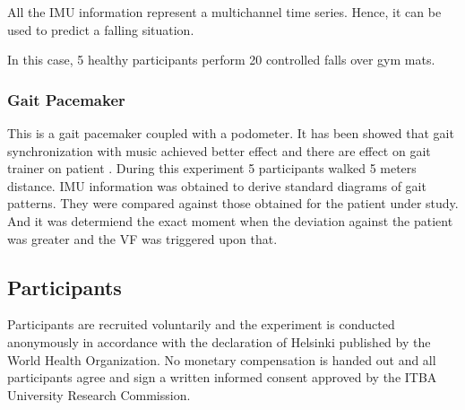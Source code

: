 \documentclass[conference]{IEEEtran}
\begin{document}
All the IMU information represent a multichannel time series.  Hence, it can be used to predict a falling situation.   

In this case, 5 healthy participants perform 20 controlled falls over gym mats.  


\subsubsection{Gait Pacemaker}

This is a gait pacemaker coupled with a podometer.  It has been showed that gait synchronization with music achieved better effect \cite{Roerdink.etal2007} and there are effect on gait trainer on patient \cite{Blicher.etal2009}.   During this experiment 5 participants walked 5 meters distance.  IMU information was obtained to derive standard diagrams of gait patterns.  They were compared against those obtained for the patient under study.  And it was determiend the exact moment when the deviation against the patient was greater and the VF was triggered upon that.



\subsection{Participants}

Participants are recruited voluntarily and the experiment is conducted anonymously in accordance with the declaration of Helsinki published by the World Health Organization. No monetary compensation is handed out and all participants agree and sign a written informed consent approved by the ITBA University Research Commission.
\end{document}
